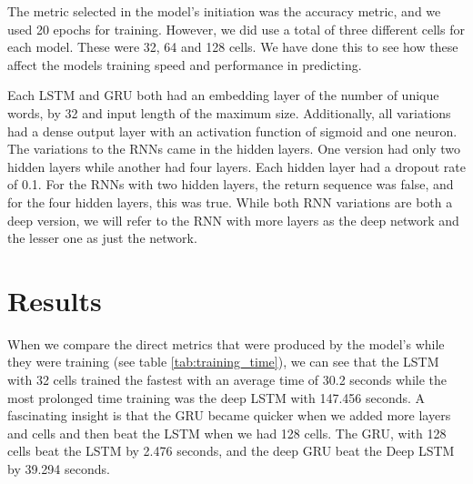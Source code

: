 \documentclass[a4paper,10pt]{article}
\begin{document}
	The metric selected in the model's initiation was the accuracy metric, and we used 20 epochs for training. However, we did use a total of three different cells for each model. These were 32, 64 and 128 cells. We have done this to see how these affect the models training speed and performance in predicting.  
	
	Each LSTM and GRU both had an embedding layer of the number of unique words, by 32 and input length of the maximum size. Additionally, all variations had a dense output layer with an activation function of sigmoid and one neuron. The variations to the RNNs came in the hidden layers. One version had only two hidden layers while another had four layers. Each hidden layer had a dropout rate of 0.1. For the RNNs with two hidden layers, the return sequence was false, and for the four hidden layers, this was true. While both RNN variations are both a deep version, we will refer to the RNN with more layers as the deep network and the lesser one as just the network.
	

\section{Results}

	When we compare the direct metrics that were produced by the model's while they were training (see table \ref{tab:training_time}), we can see that the LSTM with 32 cells trained the fastest with an average time of 30.2 seconds while the most prolonged time training was the deep LSTM with 147.456 seconds. A fascinating insight is that the GRU became quicker when we added more layers and cells and then beat the LSTM when we had 128 cells. The GRU, with 128 cells beat the LSTM by 2.476 seconds, and the deep GRU beat the Deep LSTM by 39.294 seconds.



	
\end{document}
